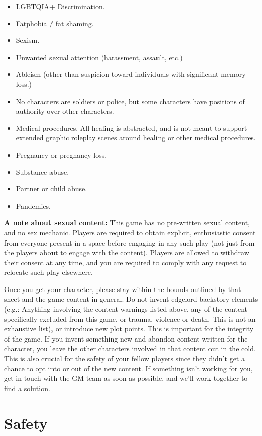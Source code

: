 \documentclass[sheet]{PP}
\begin{document}
\begin{multicols}{2}
\begin{itemize}
 	\item LGBTQIA+ Discrimination.
	\item Fatphobia / fat shaming.
	\item Sexism.
	\item Unwanted sexual attention (harassment, assault, etc.)
	\item Ableism (other than suspicion toward individuals with significant memory loss.)
	\item No characters are soldiers or police, but some characters have positions of authority over other characters.
	\item Medical procedures. All healing is abstracted, and is not meant to support extended graphic roleplay scenes around healing or other medical procedures.
	\item Pregnancy or pregnancy loss.
	\item Substance abuse.
	\item Partner or child abuse.
	\item Pandemics.
\end{itemize}
\end{multicols}

\textbf{A note about sexual content:} This game has no pre-written sexual content, and no sex mechanic. Players are required to obtain explicit, enthusiastic consent from everyone present in a space before engaging in any such play (not just from the players about to engage with the content). Players are allowed to withdraw their consent at any time, and you are required to comply with any request to relocate such play elsewhere.

Once you get your character, please stay within the bounds outlined by that sheet and the game content in general. Do not invent edgelord backstory elements (e.g.: Anything involving the content warnings listed above, any of the content specifically excluded from this game, or trauma, violence or death. This is not an exhaustive list), or introduce new plot points. This is important for the integrity of the game. If you invent something new and abandon content written for the character, you leave the other characters involved in that content out in the cold. This is also crucial for the safety of your fellow players since they didn't get a chance to opt into or out of the new content. If something isn't working for you, get in touch with the GM team as soon as possible, and we'll work together to find a solution.

\section{Safety}
\end{document}
